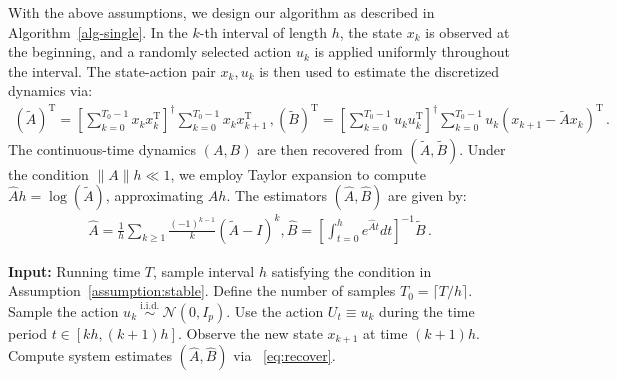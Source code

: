 \documentclass{article}
\theoremstyle{definition}
\begin{document}
With the above assumptions, we design our algorithm as described in Algorithm~\ref{alg-single}. In the $k$-th interval of length $h$, the state $x_k$ is observed at the beginning, and a randomly selected action $u_k$ is applied uniformly throughout the interval. The state-action pair ${x_k, u_k}$ is then used to estimate the discretized dynamics via:
\begin{align}\label{eq:alg1}
(\widetilde{A})^{\mathrm{T}}=\left[\sum_{k=0}^{T_{0}-1}x_{k}x^{\mathrm{T}}_{k}\right]^{\dagger}\sum_{k=0}^{T_{0}-1}x_{k}x^{\mathrm{T}}_{k+1}\,,(\widetilde{B})^{\mathrm{T}}=\left[\sum_{k=0}^{T_{0}-1}u_{k}u^{\mathrm{T}}_{k}\right]^{\dagger}\sum_{k=0}^{T_{0}-1}u_{k}\left(x_{k+1}-\widetilde{A}x_{k}\right)^{\mathrm{T}}\,.
\end{align}	
The continuous-time dynamics $(A,B)$ are then recovered from $(\widetilde{A},\widetilde{B})$. Under the condition $\|A\|h \ll 1$, we employ Taylor expansion to compute $\hat{A}h = \log(\widetilde{A})$, approximating $Ah$. The estimators $(\hat{A},\hat{B})$ are given by:
\begin{align}\label{eq:recover}
\hat{A}=\frac{1}{h}\sum_{k\geq1}\frac{(-1)^{k-1}}{k}(\widetilde{A}-I)^{k},\hat{B}=\left[\int_{t=0}^{h}e^{\hat{A}t}dt\right]^{-1}\widetilde{B}\,.
\end{align}


\begin{algorithm}[t]
	\caption{System identification algorithm for stable system} \label{alg-single}
	\begin{algorithmic}
		\STATE \textbf{Input:} Running time $T$, sample interval $h$ satisfying the condition in Assumption~\ref{assumption:stable}. 
		\STATE Define the number of samples $T_0 = \lceil T/h \rceil$.
		\STATE Sample the action $u_{k}\stackrel{\text { i.i.d. }}{\sim}\mathcal{N}\left(0, I_p\right)$.
		\STATE Use the action $U_t \equiv u_{k}$  during the time period $t \in [kh, (k+1)h]$.
		\STATE Observe the new state $x_{k+1}$ at time $(k+1)h$.
		\ENDFOR 
		\STATE Compute system estimates $(\hat{A},\hat{B})$ via ~\eqref{eq:recover}.

	\end{algorithmic}
\end{algorithm}


\end{document}
